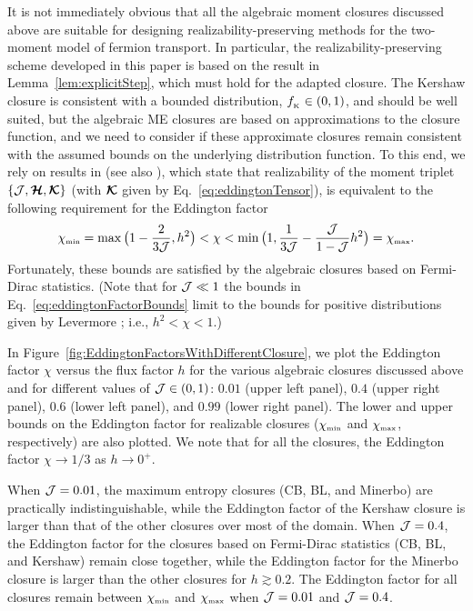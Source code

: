It is not immediately obvious that all the algebraic moment closures discussed above are suitable for designing realizability-preserving methods for the two-moment model of fermion transport.  
In particular, the realizability-preserving scheme developed in this paper is based on the result in Lemma~\ref{lem:explicitStep}, which must hold for the adapted closure.  
The Kershaw closure is consistent with a bounded distribution, $f_{_{\mbox{\tiny K}}}\in(0,1)$, and should be well suited, but the algebraic ME closures are based on approximations to the closure function, and we need to consider if these approximate closures remain consistent with the assumed bounds on the underlying distribution function.  
To this end, we rely on results in \cite{levermore_1984,lareckiBanach_2011} (see also \cite{kershaw_1976,shohatTamarkin_1943}), which state that realizability of the moment triplet $\{\mathcal{J},\boldsymbol{\mathcal{H}},\boldsymbol{\mathcal{K}}\}$ (with $\boldsymbol{\mathcal{K}}$ given by Eq.~\eqref{eq:eddingtonTensor}), is equivalent to the following requirement for the Eddington factor
\begin{equation}
  \chi_{\mbox{\tiny min}}
  =\max\big(1-\frac{2}{3\mathcal{J}},h^{2}\big)
  <\chi<\min\big(1,\frac{1}{3\mathcal{J}}-\frac{\mathcal{J}}{1-\mathcal{J}}h^{2}\big)=\chi_{\mbox{\tiny max}}.  
  \label{eq:eddingtonFactorBounds}
\end{equation}
Fortunately, these bounds are satisfied by the algebraic closures based on Fermi-Dirac statistics.  
(Note that for $\mathcal{J}\ll1$ the bounds in Eq.~\eqref{eq:eddingtonFactorBounds} limit to the bounds for positive distributions given by Levermore \cite{levermore_1984}; i.e., $h^{2}<\chi<1$.)

In Figure~\ref{fig:EddingtonFactorsWithDifferentClosure}, we plot the Eddington factor $\chi$ versus the flux factor $h$ for the various algebraic closures discussed above and for different values of $\mathcal{J}\in(0,1)$: $0.01$ (upper left panel), $0.4$ (upper right panel), $0.6$ (lower left panel), and $0.99$ (lower right panel).  
The lower and upper bounds on the Eddington factor for realizable closures ($\chi_{\mbox{\tiny min}}$ and $\chi_{\mbox{\tiny max}}$, respectively) are also plotted.  
We note that for all the closures, the Eddington factor $\chi\to1/3$ as $h\to0^{+}$.  

When $\mathcal{J}=0.01$, the maximum entropy closures (CB, BL, and Minerbo) are practically indistinguishable, while the Eddington factor of the Kershaw closure is larger than that of the other closures over most of the domain.  
When $\mathcal{J}=0.4$, the Eddington factor for the closures based on Fermi-Dirac statistics (CB, BL, and Kershaw) remain close together, while the Eddington factor for the Minerbo closure is larger than the other closures for $h\gtrsim0.2$.  
The Eddington factor for all closures remain between $\chi_{\mbox{\tiny min}}$ and $\chi_{\mbox{\tiny max}}$ when $\mathcal{J}=0.01$ and $\mathcal{J}=0.4$.  

